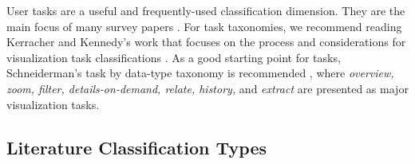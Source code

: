 User tasks are a useful and frequently-used classification dimension. They are the main focus of many survey papers \cite{ahn2014task, brehmer2013multi, schulz2013design}. For task taxonomies, we recommend reading Kerracher and Kennedy's work that focuses on the process and considerations for visualization task classifications \cite{kerracher2017constructing}. As a good starting point for tasks, Schneiderman's task by data-type taxonomy is recommended \cite{shneiderman1996eyes}, where \textit{overview, zoom, filter, details-on-demand, relate, history,} and \textit{extract} are presented as major visualization tasks.

\subsection{Literature Classification Types \cons }
